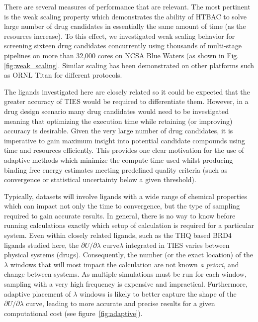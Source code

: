 \documentclass[conference]{IEEEtran}
\begin{document}
There are several measures of performance that are relevant. The most
pertinent is the weak scaling property which demonstrates the ability of HTBAC
to solve large number of drug candidates in essentially the same amount of
time (as the resources increase). To this effect, we investigated weak scaling
behavior for screening sixteen drug candidates concurrently using thousands of
multi-stage pipelines on more than 32,000 cores on NCSA Blue Waters (as shown
in Fig. \ref{fig:weak_scaling}. Similar scaling has been demonstrated on other 
platforms such as ORNL Titan for different protocols. 



The ligands investigated here are closely related so it could be expected that the
greater accuracy of TIES would be required to differentiate them.
However, in a drug design scenario many drug candidates would need to be investigated
meaning that optimizing the execution time while retaining (or improving) accuracy is
desirable. 
Given the very large number of drug candidates, it is imperative to
gain maximum insight into potential candidate compounds using time and
resources efficiently. 
This provides one clear motivation for the use of
adaptive methods which minimize the compute time used whilst producing binding
free energy estimates meeting predefined quality criteria (such as
convergence or statistical uncertainty below a given threshold).


Typically, datasets will involve ligands with a wide range of chemical 
properties which can impact not only the time to convergence, but the type 
of sampling required to gain accurate results.
In general, there is no way to know before running
calculations exactly which setup of calculation is required for a particular
system. 
Even within closely related ligands, such as the THQ based BRD4 ligands 
studied here, the $\partial U/\partial\lambda$ curve$\lambda$ integrated in TIES 
varies between physical systems (drugs). 
Consequently, the number (or the exact location) of the
$\lambda$ windows that will most impact the calculation are not known
\textit{a priori}, and change between systems. 
As multiple
simulations must be run for each window, sampling with a very high frequency
is expensive and impractical. Furthermore, adaptive placement of $\lambda$
windows is likely to better capture the shape of the
$\partial U/\partial\lambda$ curve, leading to more accurate and precise
results for a given computational cost (see figure~\ref{fig:adaptive}).
\end{document}
